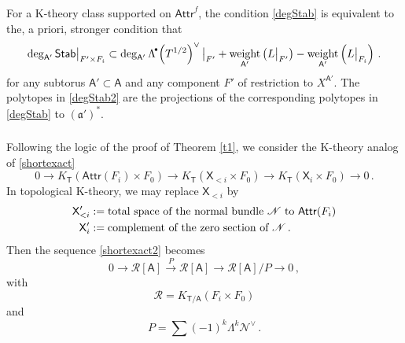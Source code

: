 \documentclass[14pt]{extarticle}
\newcommand{\bT}{\mathsf{T}}
\newcommand{\bA}{\mathsf{A}}
\newcommand{\bX}{\mathsf{X}}
\newcommand{\cR}{\mathscr{R}}
\newcommand{\cN}{\mathscr{N}}
\newcommand{\fa}{\mathfrak{a}}
\newcommand{\Stab}{\mathsf{Stab}}
\newcommand{\Attr}{\mathsf{Attr}}
\DeclareMathOperator{\weight}{weight}
\newcommand{\Ld}{{\Lambda}^{\!\raisebox{0.5mm}{$\scriptscriptstyle
      \bullet$}}\!}
\theoremstyle{definition}
\begin{document}
\subsubsection{}

For a K-theory class supported on $\Attr^f$, the condition
\eqref{degStab} is equivalent to the, a priori, stronger condition
that
%
\begin{equation}
\deg_{\bA'} \Stab\big|_{F'\times F_i} \subset
\deg_{\bA'} \Ld  \left(T^{1/2}\right)^\vee \big|_{F'} +
\weight_{\bA'}\left(L\big|_{F'}\right) -
\weight_{\bA'}\left(L\big|_{F_i}\right) \,.\label{degStab2}
\end{equation}
%
for any subtorus $\bA' \subset \bA$ and any component $F'$ of 
restriction to $X^{\bA'}$. The polytopes in \eqref{degStab2} are the
projections of the corresponding polytopes in \eqref{degStab} to
$(\fa')^*$.


\subsubsection{}

Following the logic of the proof of Theorem \ref{t1}, we consider the
K-theory analog of \eqref{shortexact} 
%
  \begin{equation}
    \label{shortexact2}
    0 \to K_\bT(\Attr(F_i) \times F_0) \to 
    K_\bT(\bX_{<i} \times F_0) \to   K_\bT(\bX_i \times F_0) \to 0  \,. 
  \end{equation}
  In topological K-theory, we may replace $\bX_{<i}$ by
  \begin{align*}
    \bX'_{<i} &:= \textup{total space of  the normal bundle $\cN$ to
               $\Attr(F_i)$} \\
    \bX'_i &:= \textup{complement of the zero section of $\cN$} \,. 
  \end{align*}
  Then the sequence
  \eqref{shortexact2} becomes
  \begin{equation}
    \label{shortexact3}
    0 \to \cR[\bA] \xrightarrow{\,\, P \, \,} 
   \cR[\bA]  \to   \cR[\bA]/P\to 0  \,, 
  \end{equation}
  with
  $$
  \cR = K_{\bT/\bA}(F_i \times F_0)
  $$
  and
  \begin{equation}
  P = \sum (-1)^k \Lambda^k \cN^\vee \,. 
\label{PLambda}
\end{equation}
%

\subsubsection{} 
\end{document}
